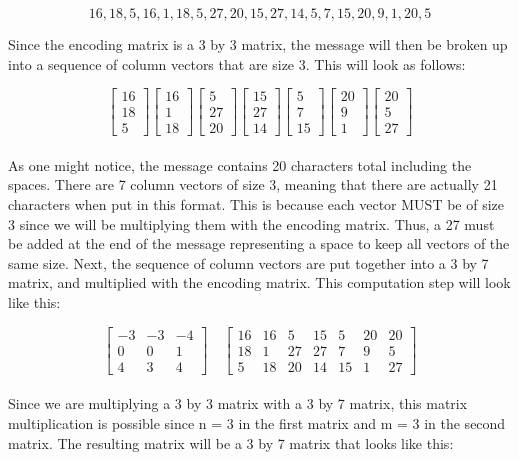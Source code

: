 \documentclass{article}
\begin{document}
$$
16, 18, 5, 16, 1, 18, 5, 27, 20, 15, 27, 14, 5, 7, 15, 20, 9, 1, 20, 5
$$

\noindent
Since the encoding matrix is a 3 by 3 matrix, the message will then be broken up into a sequence of column vectors that are size 3. This will look as follows:

$$
\begin{bmatrix}
16\\
18\\
5
\end{bmatrix}
\begin{bmatrix}
16\\
1\\
18
\end{bmatrix}
\begin{bmatrix}
5\\
27\\
20
\end{bmatrix}
\begin{bmatrix}
15\\
27\\
14
\end{bmatrix}
\begin{bmatrix}
5\\
7\\
15
\end{bmatrix}
\begin{bmatrix}
20\\
9\\
1
\end{bmatrix}
\begin{bmatrix}
20\\
5\\
27
\end{bmatrix}
$$ \\

\noindent
As one might notice, the message contains 20 characters total including the spaces. There are 7 column vectors of size 3, meaning that there are actually 21 characters when put in this format. This is because each vector MUST be of size 3 since we will be multiplying them with the encoding matrix. Thus, a 27 must be added at the end of the message representing a space to keep all vectors of the same size. Next, the sequence of column vectors are put together into a 3 by 7 matrix, and multiplied with the encoding matrix. This computation step will look like this:

$$
\begin{bmatrix}
-3 & -3 & -4 \\
0 & 0 & 1 \\
4 & 3 & 4 
\end{bmatrix}
\quad
\begin{bmatrix}
16 & 16 & 5 & 15 & 5 & 20 & 20 \\
18 & 1 & 27 & 27 & 7 & 9 & 5 \\
5 & 18 & 20 & 14 & 15 & 1 & 27
\end{bmatrix}
$$
\\
\noindent
Since we are multiplying a 3 by 3 matrix with a 3 by 7 matrix, this matrix multiplication is possible since n = 3 in the first matrix and m = 3 in the second matrix. The resulting matrix will be a 3 by 7 matrix that looks like this:
\end{document}
